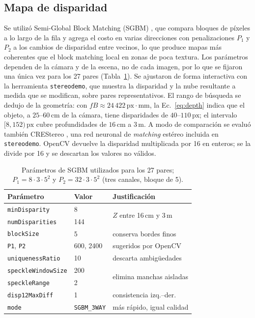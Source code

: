 \documentclass[10pt,a4paper,twocolumn]{article}
\newcommand{\px}{\,\mathrm{px}}
\newcommand{\code}[1]{\texttt{#1}}
\begin{document}
\subsection{Mapa de disparidad}
\label{sec:met-disp}

Se utilizó Semi-Global Block Matching (SGBM) \cite{sgbm}, que compara bloques de píxeles a lo largo de la fila y agrega el costo en varias direcciones con penalizaciones $P_1$ y $P_2$ a los cambios de disparidad entre vecinos, lo que produce mapas más coherentes que el block matching local en zonas de poca textura. Los parámetros dependen de la cámara y de la escena, no de cada imagen, por lo que se fijaron una única vez para los 27 pares (Tabla~\ref{tab:sgbm}). Se ajustaron de forma interactiva con la herramienta \code{stereodemo}, que muestra la disparidad y la nube resultante a medida que se modifican, sobre pares representativos. El rango de búsqueda se dedujo de la geometría: con $fB\approx24\,422\px\cdot\mathrm{mm}$, la Ec.~\eqref{eq:depth} indica que el objeto, a $25$--$60\,\mathrm{cm}$ de la cámara, tiene disparidades de $40$--$110\px$; el intervalo $[8,152)\px$ cubre profundidades de $16\,\mathrm{cm}$ a $3\,\mathrm{m}$. A modo de comparación se evaluó también CREStereo \cite{crestereo}, una red neuronal de \emph{matching} estéreo incluida en \code{stereodemo}. OpenCV devuelve la disparidad multiplicada por 16 en enteros; se la divide por 16 y se descartan los valores no válidos.

\begin{table}[!htb]
\centering\footnotesize
\setlength{\tabcolsep}{4pt}
\begin{tabular}{@{}lll@{}}
\toprule
Parámetro & Valor & Justificación\\
\midrule
\code{minDisparity} & 8 & \multirow{2}{*}{$Z$ entre 16\,cm y 3\,m}\\
\code{numDisparities} & 144 & \\
\code{blockSize} & 5 & conserva bordes finos\\
\code{P1}, \code{P2} & 600, 2400 & sugeridos por OpenCV\\
\code{uniquenessRatio} & 10 & descarta ambigüedades\\
\code{speckleWindowSize} & 200 & \multirow{2}{*}{elimina manchas aisladas}\\
\code{speckleRange} & 2 & \\
\code{disp12MaxDiff} & 1 & consistencia izq.--der.\\
\code{mode} & \code{SGBM\_3WAY} & más rápido, igual calidad\\
\bottomrule
\end{tabular}
\caption{Parámetros de SGBM utilizados para los 27 pares; $P_1=8\cdot3\cdot5^2$ y $P_2=32\cdot3\cdot5^2$ (tres canales, bloque de 5).}
\label{tab:sgbm}
\end{table}
\end{document}
